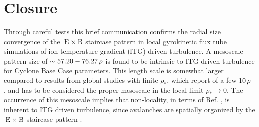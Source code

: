 
\chapter{Closure}
\label{chap:close}
\thispagestyle{empty}
\newpage

Through careful tests this brief communication confirms the radial size convergence of the $\mathrm{\:E}\times\mathrm{B}$ staircase pattern in local gyrokinetic flux tube simulations of ion temperature gradient (ITG) driven turbulence.
A mesoscale pattern size of $\sim 57.20 - 76.27\,\rho$ is found to be intrinsic to ITG driven turbulence for Cyclone Base Case parameters.
This length scale is somewhat larger compared to results from global studies with finite $\rho_\ast$, which report of a few $10\,\rho$ \cite{pradalier2010}, and has to be considered the proper mesoscale in the local limit $\rho_\ast \rightarrow 0$.  
The occurrence of this mesoscale implies that non-locality, in terms of Ref. \cite{pradalier2010}, is inherent to ITG driven turbulence, since avalanches are spatially organized by the $\mathrm{\:E}\times\mathrm{B}$ staircase pattern \cite{mcmillan2009, pradalier2010, rath2016, peeters2016}. 